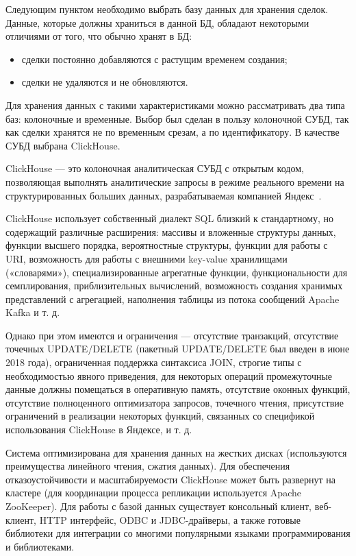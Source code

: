 Следующим пунктом необходимо выбрать базу данных для хранения сделок. Данные, которые должны храниться в данной БД, обладают некоторыми отличиями от того, что обычно хранят в БД:
\begin{itemize}
    \item сделки постоянно добавляются с растущим временем создания;
    \item сделки не удаляются и не обновляются.
\end{itemize}

Для хранения данных с такими характеристиками можно рассматривать два типа баз: колоночные и временные. Выбор был сделан в пользу колоночной СУБД, так как сделки хранятся не по временным срезам, а по идентификатору. В качестве СУБД выбрана ClickHouse.

ClickHouse — это колоночная аналитическая СУБД с открытым кодом, позволяющая выполнять аналитические запросы в режиме реального времени на структурированных больших данных, разрабатываемая компанией Яндекс~\cite{clickhouse}.

ClickHouse использует собственный диалект SQL близкий к стандартному, но содержащий различные расширения: массивы и вложенные структуры данных, функции высшего порядка, вероятностные структуры, функции для работы с URI, возможность для работы с внешними key-value хранилищами («словарями»), специализированные агрегатные функции, функциональности для семплирования, приблизительных вычислений, возможность создания хранимых представлений с агрегацией, наполнения таблицы из потока сообщений Apache Kafka и т. д.

Однако при этом имеются и ограничения — отсутствие транзакций, отсутствие точечных UPDATE/DELETE (пакетный UPDATE/DELETE был введен в июне 2018 года), ограниченная поддержка синтаксиса JOIN, строгие типы с необходимостью явного приведения, для некоторых операций промежуточные данные должны помещаться в оперативную память, отсутствие оконных функций, отсутствие полноценного оптимизатора запросов, точечного чтения, присутствие ограничений в реализации некоторых функций, связанных со спецификой использования ClickHouse в Яндексе, и т. д.

Система оптимизирована для хранения данных на жестких дисках (используются преимущества линейного чтения, сжатия данных). Для обеспечения отказоустойчивости и масштабируемости ClickHouse может быть развернут на кластере (для координации процесса репликации используется Apache ZooKeeper). Для работы с базой данных существует консольный клиент, веб-клиент, HTTP интерфейс, ODBC и JDBC-драйверы, а также готовые библиотеки для интеграции со многими популярными языками программирования и библиотеками.

